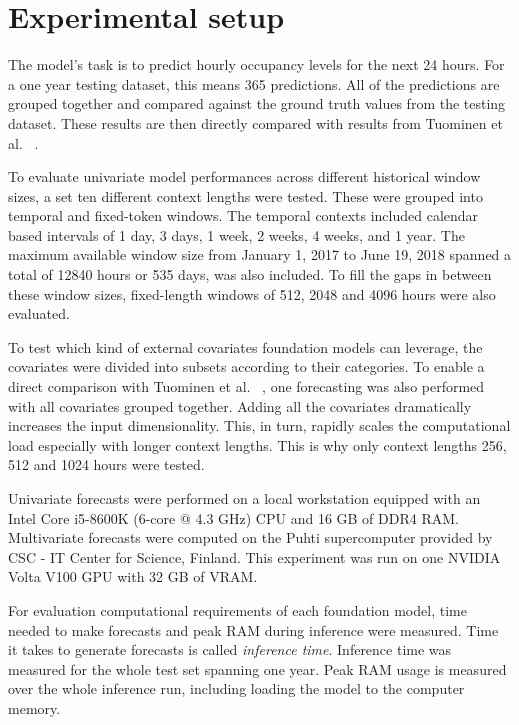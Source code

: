 

\section{Experimental setup}

The model's task is to predict hourly occupancy levels for the next 24 hours. For a one year testing dataset, this means 365 predictions. All of the predictions are grouped together and compared against the ground truth values from the testing dataset. These results are then directly compared with results from Tuominen et al. ~\cite{tuominen_forecasting_2024}.

To evaluate univariate model performances across different historical window sizes, a set ten different context lengths were tested. These were grouped into temporal and fixed-token windows. The temporal contexts included calendar based intervals of 1 day, 3 days, 1 week, 2 weeks, 4 weeks, and 1 year. The maximum available window size from January 1, 2017 to June 19, 2018 spanned a total of 12840 hours or 535 days, was also included. To fill the gaps in between these window sizes, fixed-length windows of 512, 2048 and 4096 hours were also evaluated.

To test which kind of external covariates foundation models can leverage, the covariates were divided into subsets according to their categories. To enable a direct comparison with Tuominen et al. ~\cite{tuominen_forecasting_2024}, one forecasting was also performed with all covariates grouped together. Adding all the covariates dramatically increases the input dimensionality. This, in turn, rapidly scales the computational load especially with longer context lengths. This is why only context lengths 256, 512 and 1024 hours were tested.

Univariate forecasts were performed on a local workstation equipped with an Intel Core i5-8600K (6-core @ 4.3 GHz) CPU and 16 GB of DDR4 RAM. Multivariate forecasts were computed on the Puhti supercomputer provided by CSC - IT Center for Science, Finland. This experiment was run on one NVIDIA Volta V100 GPU with 32 GB of VRAM.

For evaluation computational requirements of each foundation model, time needed to make forecasts and peak RAM during inference were measured. Time it takes to generate forecasts is called \emph{inference time}. Inference time was measured for the whole test set spanning one year. Peak RAM usage is measured over the whole inference run, including loading the model to the computer memory.

